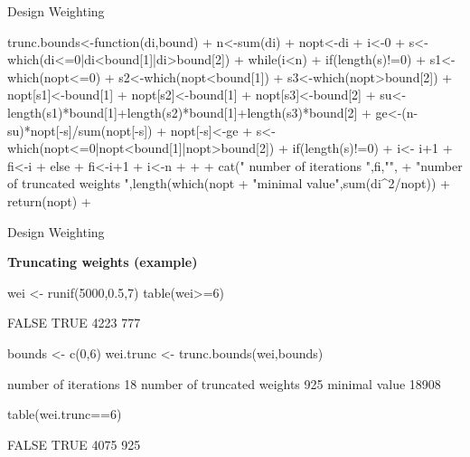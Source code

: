 \documentclass[11pt,german,hideothersubsections]{beamer}
\begin{document}
\begin{frame}[fragile]{Design Weighting}
\tiny{
\begin{Schunk}
\begin{Sinput}
 trunc.bounds<-function(di,bound){
+   n<-sum(di)
+   nopt<-di
+   i<-0
+   s<-which(di<=0|di<bound[1]|di>bound[2])
+   while(i<n){
+       if(length(s)!=0){
+       s1<-which(nopt<=0)
+       s2<-which(nopt<bound[1])
+       s3<-which(nopt>bound[2])
+       nopt[s1]<-bound[1]
+       nopt[s2]<-bound[1]
+       nopt[s3]<-bound[2]
+       su<-length(s1)*bound[1]+length(s2)*bound[1]+length(s3)*bound[2]
+       ge<-(n-su)*nopt[-s]/sum(nopt[-s])
+       nopt[-s]<-ge
+       s<-which(nopt<=0|nopt<bound[1]|nopt>bound[2])}
+       if(length(s)!=0){
+       i<- i+1
+       fi<-i}
+       else {
+         fi<-i+1
+         i<-n
+       }
+     }
+   cat(" number of iterations ",fi,"\n",
+       "number of truncated weights ",length(which(nopt%in%bound)),"\n",
+   "minimal value",sum(di^2/nopt))
+   return(nopt)
+ }
\end{Sinput}
\end{Schunk}
}
\end{frame}
\begin{frame}[fragile]{Design Weighting}
\footnotesize{
\begin{center}
\textbf{Truncating weights (example) }
\end{center}

\begin{Schunk}
\begin{Sinput}
 wei <- runif(5000,0.5,7)
 table(wei>=6)
\end{Sinput}
\begin{Soutput}
FALSE  TRUE 
 4223   777 
\end{Soutput}
\begin{Sinput}
 bounds <- c(0,6)
 wei.trunc <- trunc.bounds(wei,bounds)
\end{Sinput}
\begin{Soutput}
 number of iterations  18 
 number of truncated weights  925 
 minimal value 18908
\end{Soutput}
\begin{Sinput}
 table(wei.trunc==6)
\end{Sinput}
\begin{Soutput}
FALSE  TRUE 
 4075   925 
\end{Soutput}
\end{Schunk}
}
\end{frame}
\end{document}
